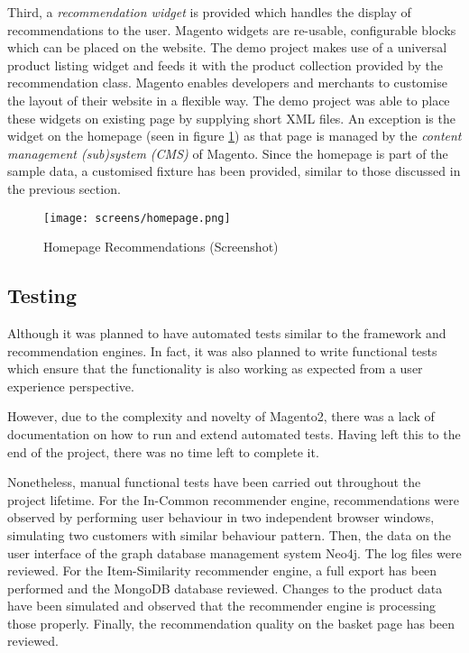 Third, a \emph{recommendation widget} is provided which handles the display of recommendations to the user. Magento widgets are re-usable, configurable blocks which can be placed on the website. The demo project makes use of a universal product listing widget and feeds it with the product collection provided by the recommendation class. Magento enables developers and merchants to customise the layout of their website in a flexible way. The demo project was able to place these widgets on existing page by supplying short XML files. An exception is the widget on the homepage (seen in figure \ref{fig:implementation-magento-homepage}) as that page is managed by the \emph{content management (sub)system (CMS)} of Magento. Since the homepage is part of the sample data, a customised fixture has been provided, similar to those discussed in the previous section.

\begin{figure}[!ht]
    \texttt{[image: screens/homepage.png]}
    \caption{Homepage Recommendations (Screenshot)}
    \label{fig:implementation-magento-homepage}
\end{figure}

\subsection{Testing}

Although it was planned to have automated tests similar to the framework and recommendation engines. In fact, it was also planned to write functional tests which ensure that the functionality is also working as expected from a user experience perspective.

However, due to the complexity and novelty of Magento2, there was a lack of documentation on how to run and extend automated tests. Having left this to the end of the project, there was no time left to complete it.

Nonetheless, manual functional tests have been carried out throughout the project lifetime. For the In-Common recommender engine, recommendations were observed by performing user behaviour in two independent browser windows, simulating two customers with similar behaviour pattern. Then, the data on the user interface of the graph database management system Neo4j. The log files were reviewed. For the Item-Similarity recommender engine, a full export has been performed and the MongoDB database reviewed. Changes to the product data have been simulated and observed that the recommender engine is processing those properly. Finally, the recommendation quality on the basket page has been reviewed.

